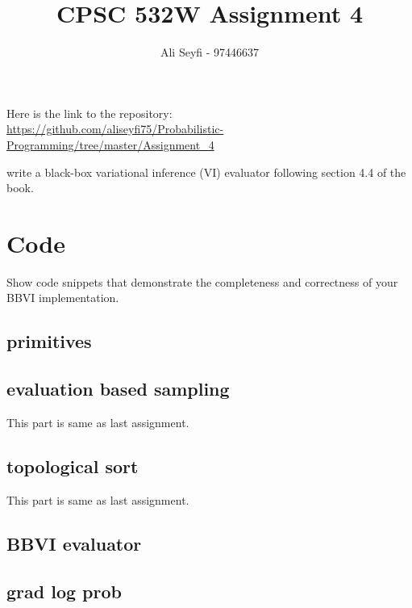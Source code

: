 \documentclass{article}
\def\blu#1{{\color{blu}#1}}
\begin{document}
\title{\vspace{-20mm}
CPSC 532W Assignment 4}
\author{Ali Seyfi - 97446637}
\date{}
\maketitle

Here is the link to the repository:\\
\url{https://github.com/aliseyfi75/Probabilistic-Programming/tree/master/Assignment_4}


\blu{write a black-box variational inference (VI) evaluator following section 4.4 of the book.  }

\section{Code}
\blu{Show code snippets that demonstrate the completeness and correctness of your BBVI implementation.}
\subsection{primitives}
\label{primitives}

\pagebreak

\pagebreak


\subsection{evaluation based sampling}
This part is same as last assignment.
\subsection{topological sort}
This part is same as last assignment.
\pagebreak
\subsection{BBVI evaluator}

\subsection{grad log prob}

\pagebreak
\end{document}
